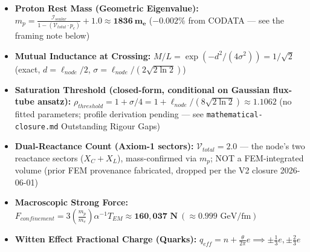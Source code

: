 \begin{itemize}
    \item \textbf{Proton Rest Mass (Geometric Eigenvalue):} $m_p = \frac{\mathcal{I}_{scalar}}{1 - (\mathcal{V}_{total} \cdot p_c)} + 1.0 \approx \mathbf{1836\ m_e}$ ($-0.002\%$ from CODATA --- see the framing note below)
    \item \textbf{Mutual Inductance at Crossing:} $M/L = \exp(-d^2/(4\sigma^2)) = 1/\sqrt{2}$ (exact, $d = \ell_{node}/2$, $\sigma = \ell_{node}/(2\sqrt{2\ln2})$)
    \item \textbf{Saturation Threshold (closed-form, conditional on Gaussian flux-tube ansatz):} $\rho_{threshold} = 1 + \sigma/4 = 1 + \ell_{node}/(8\sqrt{2\ln 2}) \approx 1.1062$ (no fitted parameters; profile derivation pending — see \texttt{mathematical-closure.md} Outstanding Rigour Gaps)
    \item \textbf{Dual-Reactance Count (Axiom-1 sectors):} $\mathcal{V}_{total} = 2.0$ --- the node's two reactance sectors ($X_C + X_L$), mass-confirmed via $m_p$; NOT a FEM-integrated volume (prior FEM provenance fabricated, dropped per the V2 closure 2026-06-01)
    \item \textbf{Macroscopic Strong Force:} $F_{confinement} = 3 \left(\frac{m_p}{m_e}\right) \alpha^{-1} T_{EM} \approx \mathbf{160{,}037\text{ N}} \ (\approx 0.999\text{ GeV/fm})$
    \item \textbf{Witten Effect Fractional Charge (Quarks):} $q_{eff} = n + \frac{\theta}{2\pi}e \implies \pm \frac{1}{3}e, \pm \frac{2}{3}e$

\end{itemize}
